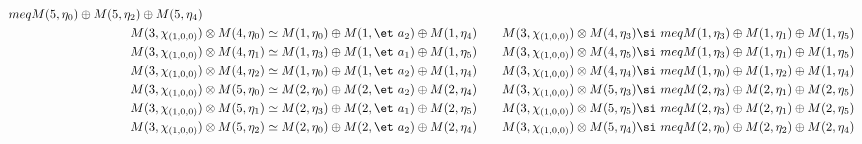 \begin{align*}
meq M(5,\eta_{0}) \oplus M(5,\eta_{2}) \oplus M(5,\eta_{4})\\
M(3,\chi_{(1,0,0)}) &\otimes M(4,\eta_{0}) \simeq M(1,\eta_{0}) \oplus M(1,\et\
a_{2}) \oplus M(1,\eta_{4}) &&& M(3,\chi_{(1,0,0)}) &\otimes M(4,\eta_{3}) \si\
meq M(1,\eta_{3}) \oplus M(1,\eta_{1}) \oplus M(1,\eta_{5})\\
M(3,\chi_{(1,0,0)}) &\otimes M(4,\eta_{1}) \simeq M(1,\eta_{3}) \oplus M(1,\et\
a_{1}) \oplus M(1,\eta_{5}) &&& M(3,\chi_{(1,0,0)}) &\otimes M(4,\eta_{5}) \si\
meq M(1,\eta_{3}) \oplus M(1,\eta_{1}) \oplus M(1,\eta_{5})\\
M(3,\chi_{(1,0,0)}) &\otimes M(4,\eta_{2}) \simeq M(1,\eta_{0}) \oplus M(1,\et\
a_{2}) \oplus M(1,\eta_{4}) &&& M(3,\chi_{(1,0,0)}) &\otimes M(4,\eta_{4}) \si\
meq M(1,\eta_{0}) \oplus M(1,\eta_{2}) \oplus M(1,\eta_{4})\\
M(3,\chi_{(1,0,0)}) &\otimes M(5,\eta_{0}) \simeq M(2,\eta_{0}) \oplus M(2,\et\
a_{2}) \oplus M(2,\eta_{4}) &&& M(3,\chi_{(1,0,0)}) &\otimes M(5,\eta_{3}) \si\
meq M(2,\eta_{3}) \oplus M(2,\eta_{1}) \oplus M(2,\eta_{5})\\
M(3,\chi_{(1,0,0)}) &\otimes M(5,\eta_{1}) \simeq M(2,\eta_{3}) \oplus M(2,\et\
a_{1}) \oplus M(2,\eta_{5}) &&& M(3,\chi_{(1,0,0)}) &\otimes M(5,\eta_{5}) \si\
meq M(2,\eta_{3}) \oplus M(2,\eta_{1}) \oplus M(2,\eta_{5})\\
M(3,\chi_{(1,0,0)}) &\otimes M(5,\eta_{2}) \simeq M(2,\eta_{0}) \oplus M(2,\et\
a_{2}) \oplus M(2,\eta_{4}) &&& M(3,\chi_{(1,0,0)}) &\otimes M(5,\eta_{4}) \si\
meq M(2,\eta_{0}) \oplus M(2,\eta_{2}) \oplus M(2,\eta_{4})\\
\end{align*}

